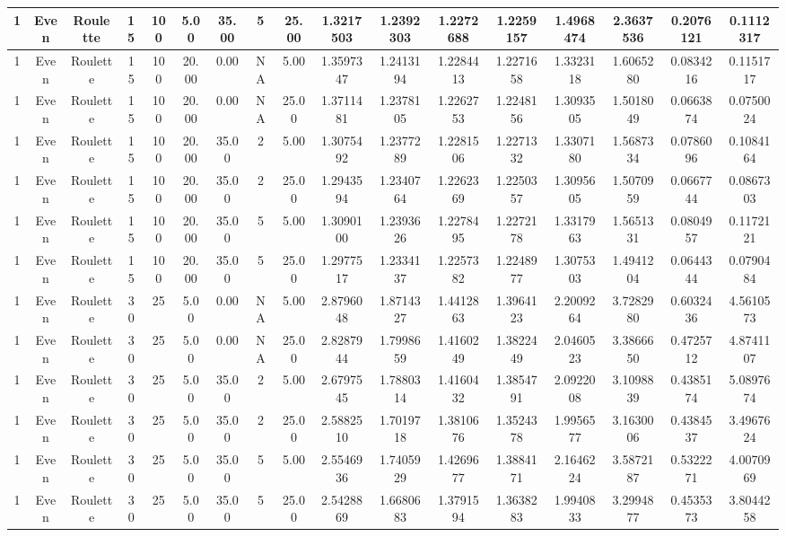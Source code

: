 \documentclass[a4paper]{article}
\begin{document}
\begin{center}
\begin{tabular}{ | c | c | c | c | c | c | c | c | c | c | c | c | c | c | c | c | c | }
		\hline
		1	&	Even	&	Roulette	&	15	&	100	&	5.00	&	35.00	&	5	&	25.00	&	1.3217503	&	1.2392303	&	1.2272688	&	1.2259157	&	1.4968474	&	2.3637536	&	0.2076121	&	0.1112317 \\
		\hline
		1	&	Even	&	Roulette	&	15	&	100	&	20.00	&	0.00	&	NA	&	5.00	&	1.3597347	&	1.2413194	&	1.2284413	&	1.2271658	&	1.3323118	&	1.6065280	&	0.0834216	&	0.1151717 \\
		\hline
		1	&	Even	&	Roulette	&	15	&	100	&	20.00	&	0.00	&	NA	&	25.00	&	1.3711481	&	1.2378105	&	1.2262753	&	1.2248156	&	1.3093505	&	1.5018049	&	0.0663874	&	0.0750024 \\
		\hline
		1	&	Even	&	Roulette	&	15	&	100	&	20.00	&	35.00	&	2	&	5.00	&	1.3075492	&	1.2377289	&	1.2281506	&	1.2271332	&	1.3307180	&	1.5687334	&	0.0786096	&	0.1084164 \\
		\hline
		1	&	Even	&	Roulette	&	15	&	100	&	20.00	&	35.00	&	2	&	25.00	&	1.2943594	&	1.2340764	&	1.2262369	&	1.2250357	&	1.3095605	&	1.5070959	&	0.0667744	&	0.0867303 \\
		\hline
		1	&	Even	&	Roulette	&	15	&	100	&	20.00	&	35.00	&	5	&	5.00	&	1.3090100	&	1.2393626	&	1.2278495	&	1.2272178	&	1.3317963	&	1.5651331	&	0.0804957	&	0.1172121 \\
		\hline
		1	&	Even	&	Roulette	&	15	&	100	&	20.00	&	35.00	&	5	&	25.00	&	1.2977517	&	1.2334137	&	1.2257382	&	1.2248977	&	1.3075303	&	1.4941204	&	0.0644344	&	0.0790484 \\
		\hline
		1	&	Even	&	Roulette	&	30	&	25	&	5.00	&	0.00	&	NA	&	5.00	&	2.8796048	&	1.8714327	&	1.4412863	&	1.3964123	&	2.2009264	&	3.7282980	&	0.6032436	&	4.5610573 \\
		\hline
		1	&	Even	&	Roulette	&	30	&	25	&	5.00	&	0.00	&	NA	&	25.00	&	2.8287944	&	1.7998659	&	1.4160249	&	1.3822449	&	2.0460523	&	3.3866650	&	0.4725712	&	4.8741107 \\
		\hline
		1	&	Even	&	Roulette	&	30	&	25	&	5.00	&	35.00	&	2	&	5.00	&	2.6797545	&	1.7880314	&	1.4160432	&	1.3854791	&	2.0922008	&	3.1098839	&	0.4385174	&	5.0897674 \\
		\hline
		1	&	Even	&	Roulette	&	30	&	25	&	5.00	&	35.00	&	2	&	25.00	&	2.5882510	&	1.7019718	&	1.3810676	&	1.3524378	&	1.9956577	&	3.1630006	&	0.4384537	&	3.4967624 \\
		\hline
		1	&	Even	&	Roulette	&	30	&	25	&	5.00	&	35.00	&	5	&	5.00	&	2.5546936	&	1.7405929	&	1.4269677	&	1.3884171	&	2.1646224	&	3.5872187	&	0.5322271	&	4.0070969 \\
		\hline
		1	&	Even	&	Roulette	&	30	&	25	&	5.00	&	35.00	&	5	&	25.00	&	2.5428869	&	1.6680683	&	1.3791594	&	1.3638283	&	1.9940833	&	3.2994877	&	0.4535373	&	3.8044258 \\

\end{tabular}
\end{center}
\end{document}
